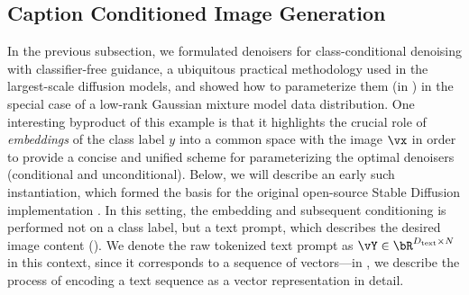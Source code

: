 \documentclass[../../book-main.tex]{subfiles}
\begin{document}
\subsection{Caption Conditioned Image Generation}\label{sub:text-cond}

In the previous subsection, we formulated denoisers for class-conditional
denoising with classifier-free guidance, a ubiquitous practical methodology used
in the largest-scale diffusion models, and showed how to parameterize them (in
) in the special case of a low-rank
Gaussian mixture model data distribution.
One interesting byproduct of this example is that it highlights the crucial role
of \textit{embeddings} of the class label $y$ into a common space with the image $\vx$ in
order to provide a concise and unified scheme for parameterizing the optimal
denoisers (conditional and unconditional).
Below, we will describe an early such instantiation, which
formed the basis for the original open-source Stable Diffusion implementation
\cite{rombach2022high}.
In this setting, the embedding and subsequent conditioning is performed not on
a class label, but a text prompt, which describes the desired image content
(). We denote the raw tokenized text prompt as $\vY \in
\bR^{D_{\mathrm{text}} \times N}$ in this context, since it corresponds to a sequence of
vectors---in , we describe the process of encoding a text
sequence as a vector representation in detail.
\end{document}
